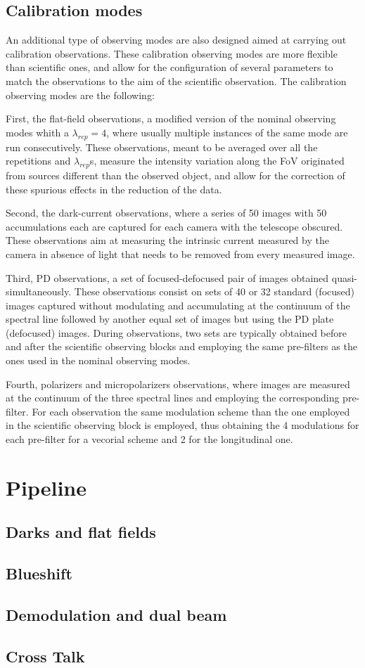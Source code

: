 \subsection{Calibration modes}
An additional type of observing modes are also designed aimed at carrying out calibration observations. These calibration observing modes are more flexible than scientific ones, and allow for the configuration of several parameters to match the observations to the aim of the scientific observation. The calibration observing modes are the following:

First, the flat-field observations, a modified version of the nominal observing modes whith a $\lambda _ {rep} = 4$, where usually multiple instances of the same mode are run consecutively. These observations, meant to be averaged over all the repetitions and $\lambda_{rep}$s, measure the intensity variation along the FoV originated from sources different than the observed object, and allow for the correction of these spurious effects in the reduction of the data. 

Second, the dark-current observations, where a series of 50 images with 50 accumulations each are captured for each camera with the telescope obscured. These observations aim at measuring the intrinsic current measured by the camera in absence of light that needs to be removed from every measured image.

Third, PD observations, a set of focused-defocused pair of images obtained quasi-simultaneously. These observations consist on sets of 40 or 32 standard (focused) images captured without modulating and accumulating at the continuum of the spectral line followed by another equal set of images but using the PD plate (defocused) images. During observations, two sets are typically obtained before and after the scientific observing blocks and employing the same pre-filters as the ones used in the nominal observing modes.

Fourth, polarizers and micropolarizers observations, where images are measured at the continuum of the three spectral lines and employing the corresponding pre-filter. For each observation the same modulation scheme than the one employed in the scientific observing block is employed, thus obtaining the 4 modulations for each pre-filter for a vecorial scheme and 2 for the longitudinal one.  





\section{Pipeline}
\subsection{Darks and flat fields}
\subsection{Blueshift}
\subsection{Demodulation and dual beam}
\subsection{Cross Talk}


